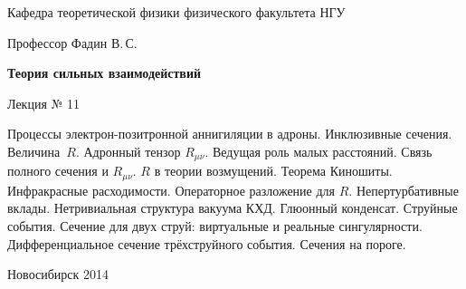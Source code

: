 \documentclass[12pt,pagesize,paper=landscape,paper=192mm:108mm]{scrbook}
\begin{document}
\begin{titlepage}
\begin{center}
    Кафедра теоретической физики физического факультета НГУ
    \medskip

    \Large
    Профессор Фадин В.\,С.

    \huge
    \textbf{Теория сильных взаимодействий}
    \smallskip
    
    \Large
    Лекция № 11
    \vfill
    
    \normalsize
    \begin{minipage}{0.9\linewidth}
      Процессы электрон-позитронной аннигиляции в адроны. Инклюзивные
      сечения. Величина~$R$. Адронный тензор $R_{\mu\nu}$. Ведущая
      роль малых расстояний. Связь полного сечения и $R_{\mu\nu}$. $R$
      в теории возмущений. Теорема Киношиты. Инфракрасные
      расходимости. Операторное разложение для $R$. Непертурбативные
      вклады. Нетривиальная структура вакуума КХД. Глюонный
      конденсат. Струйные события. Сечение для двух струй: виртуальные
      и реальные сингулярности. Дифференциальное сечение трёхструйного
      события. Сечения на пороге.
    \end{minipage}
    \vfill
    
    \normalsize \ccbysa\hspace{0.5em} Новосибирск 2014   
  \end{center}
\end{titlepage}
\end{document}
